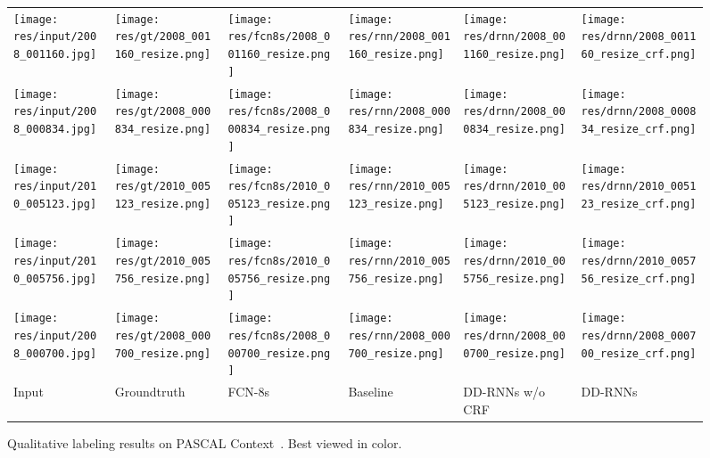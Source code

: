 \documentclass[10pt,twocolumn,letterpaper]{article}
\begin{document}
\begin{figure*}[!htb]
\centering
\begin{tabular}{@{}C{2.83cm}@{}C{2.83cm}@{}C{2.83cm}@{}C{2.83cm}@{}C{2.83cm}@{}C{2.83cm}@{}}
\texttt{[image: res/input/2008\_001160.jpg]}&\texttt{[image: res/gt/2008\_001160\_resize.png]}& \texttt{[image: res/fcn8s/2008\_001160\_resize.png]}&\texttt{[image: res/rnn/2008\_001160\_resize.png]}&\texttt{[image: res/drnn/2008\_001160\_resize.png]}&\texttt{[image: res/drnn/2008\_001160\_resize\_crf.png]}\\
\texttt{[image: res/input/2008\_000834.jpg]}&\texttt{[image: res/gt/2008\_000834\_resize.png]}& \texttt{[image: res/fcn8s/2008\_000834\_resize.png]}&\texttt{[image: res/rnn/2008\_000834\_resize.png]}&\texttt{[image: res/drnn/2008\_000834\_resize.png]}&\texttt{[image: res/drnn/2008\_000834\_resize\_crf.png]}\\
\texttt{[image: res/input/2010\_005123.jpg]}&\texttt{[image: res/gt/2010\_005123\_resize.png]}& \texttt{[image: res/fcn8s/2010\_005123\_resize.png]}&\texttt{[image: res/rnn/2010\_005123\_resize.png]}&\texttt{[image: res/drnn/2010\_005123\_resize.png]}&\texttt{[image: res/drnn/2010\_005123\_resize\_crf.png]}\\
\texttt{[image: res/input/2010\_005756.jpg]}&\texttt{[image: res/gt/2010\_005756\_resize.png]}& \texttt{[image: res/fcn8s/2010\_005756\_resize.png]}&\texttt{[image: res/rnn/2010\_005756\_resize.png]}&\texttt{[image: res/drnn/2010\_005756\_resize.png]}&\texttt{[image: res/drnn/2010\_005756\_resize\_crf.png]}\\
\texttt{[image: res/input/2008\_000700.jpg]}&\texttt{[image: res/gt/2008\_000700\_resize.png]}& \texttt{[image: res/fcn8s/2008\_000700\_resize.png]}&\texttt{[image: res/rnn/2008\_000700\_resize.png]}&\texttt{[image: res/drnn/2008\_000700\_resize.png]}&\texttt{[image: res/drnn/2008\_000700\_resize\_crf.png]}\\
\small{Input} & \small{Groundtruth} & \small{FCN-8s} & \small{Baseline} & \small{DD-RNNs w/o CRF}  & \small{DD-RNNs}\\
\end{tabular}
\caption{Qualitative labeling results on PASCAL Context~\cite{mottaghi2014role}. Best viewed in color.}
\label{fig:fig5}
\end{figure*}
\end{document}
